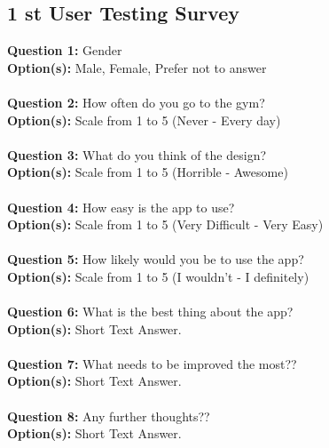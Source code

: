 \documentclass{l4proj}
\begin{document}
\begin{appendices}
\chapter{1 st User Testing Survey}
\label{survey}
\textbf{Question 1:} Gender \\
\textbf{Option(s):}    Male, Female, Prefer not to answer
\\
\\
\textbf{Question 2:} How often do you go to the gym? \\
\textbf{Option(s):}    Scale from 1 to 5 (Never - Every day)
\\
\\
\textbf{Question 3:} What do you think of the design? \\
\textbf{Option(s):}    Scale from 1 to 5 (Horrible - Awesome)
\\
\\
\textbf{Question 4:} How easy is the app to use? \\
\textbf{Option(s):}    Scale from 1 to 5 (Very Difficult - Very Easy)
\\
\\
\textbf{Question 5:} How likely would you be to use the app? 
\\
\textbf{Option(s):}    Scale from 1 to 5 (I wouldn't - I definitely)
\\
\\
\textbf{Question 6:} What is the best thing about the app? \\
\textbf{Option(s):}     Short Text Answer.
\\
\\
\textbf{Question 7:} What needs to be improved the most?? \\
\textbf{Option(s):}     Short Text Answer.
\\
\\
\textbf{Question 8:} Any further thoughts?? \\
\textbf{Option(s):}     Short Text Answer.



\end{appendices}
\end{document}
